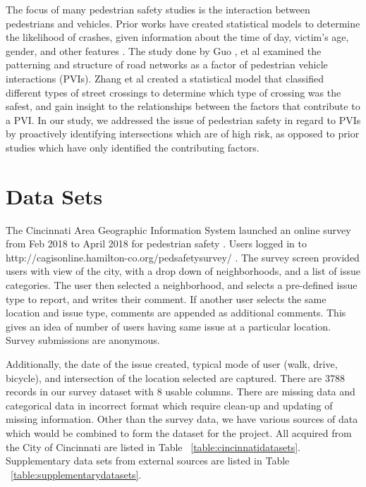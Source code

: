 \documentclass{llncs}
\begin{document}
The focus of many pedestrian safety studies is the interaction between pedestrians and vehicles. Prior works have created statistical models to determine the likelihood of crashes, given information about the time of day, victim's age, gender, and other features \cite{brude1993models} \cite{lascala2000demographic} \cite{lyon2002pedestrian} \cite{ladron2004forecasting} \cite{pulugurtha2011pedestrian} \cite{ukkusuri2011random}. The study done by Guo \cite{guo2017effect}, et al examined the patterning and structure of road networks as a factor of pedestrian vehicle interactions (PVIs). Zhang et al \cite{zhang2017quantitative} created a statistical model that classified different types of street crossings to determine which type of crossing was the safest, and gain insight to the relationships between the factors that contribute to a PVI. In our study, we addressed the issue of pedestrian safety in regard to PVIs by proactively identifying intersections which are of high risk, as opposed to prior studies which have only identified the contributing factors.


\section{Data Sets}
%
%
The Cincinnati Area Geographic Information System launched an online survey from Feb 2018 to April 2018 for pedestrian safety \cite{cvg2018city}. Users logged in to http://cagisonline.hamilton-co.org/pedsafetysurvey/ . The survey screen provided users with view of the city, with a drop down of neighborhoods, and a list of issue categories. The user then selected a neighborhood, and selects a pre-defined issue type to report, and writes their comment. If another user selects the same location and issue type, comments are appended as additional comments. This gives an idea of number of users having same issue at a particular location. Survey submissions are anonymous.

Additionally, the date of the issue created, typical mode of user (walk, drive, bicycle), and intersection of the location selected are captured. There are 3788 records in our survey dataset with 8 usable columns. There are missing data and categorical data in incorrect format which require clean-up and updating of missing information. Other than the survey data, we have various sources of data which would be combined to form the dataset for the project. All acquired from the City of Cincinnati are listed in Table ~\ref{table:cincinnatidatasets}. Supplementary data sets from external sources are listed in Table ~\ref{table:supplementarydatasets}.
\end{document}
